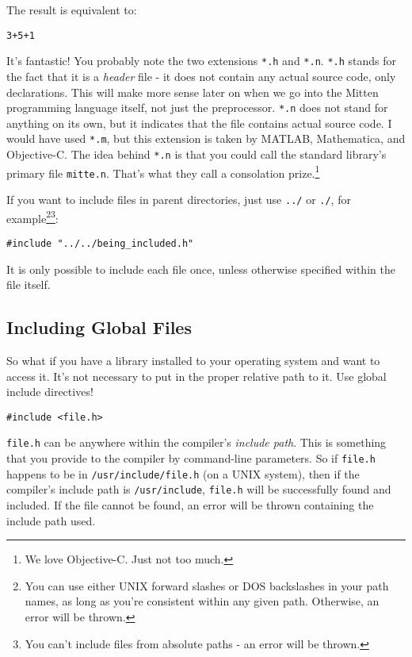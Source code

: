 \documentclass[10pt,a4paper]{article}
\begin{document}
The result is equivalent to:
\begin{verbatim}
3+5+1
\end{verbatim}

It's fantastic! You probably note the two extensions \verb|*.h| and \verb|*.n|. \verb|*.h| stands for the fact that it is a \textit{header} file - it does not contain any actual source code, only declarations. This will make more sense later on when we go into the Mitten programming language itself, not just the preprocessor. \verb|*.n| does not stand for anything on its own, but it indicates that the file contains actual source code. I would have used \verb|*.m|, but this extension is taken by MATLAB, Mathematica, and Objective-C. The idea behind \verb|*.n| is that you could call the standard library's primary file \verb|mitte.n|. That's what they call a consolation prize.\footnote{We love Objective-C. Just not too much.}

If you want to include files in parent directories, just use \verb|../| or \verb|./|, for example\footnote{You can use either UNIX forward slashes or DOS backslashes in your path names, as long as you're consistent within any given path. Otherwise, an error will be thrown.}\footnote{You can't include files from absolute paths - an error will be thrown.}:
\begin{verbatim}
#include "../../being_included.h"
\end{verbatim}

It is only possible to include each file once, unless otherwise specified within the file itself.

\newpage




\subsection{Including Global Files}
So what if you have a library installed to your operating system and want to access it. It's not necessary to put in the proper relative path to it. Use global include directives!
\begin{verbatim}
#include <file.h>
\end{verbatim}

\verb|file.h| can be anywhere within the compiler's \textit{include path}. This is something that you provide to the compiler by command-line parameters. So if \verb|file.h| happens to be in \verb|/usr/include/file.h| (on a UNIX system), then if the compiler's include path is \verb|/usr/include|, \verb|file.h| will be successfully found and included. If the file cannot be found, an error will be thrown containing the include path used.
\end{document}
